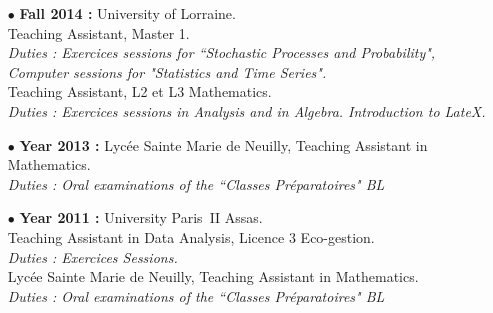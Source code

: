 \documentclass[a4paper]{article}
\begin{document}
\begin{itemize}
\item[$\bullet$] \textbf{ Fall 2014 :}  University of Lorraine.\\
					Teaching Assistant, Master 1. \\
					\textit{Duties : Exercices sessions for ``Stochastic Processes and Probability", Computer sessions for "Statistics and Time Series".}\\
					Teaching Assistant, L2 et L3 Mathematics. \\
					\textit{Duties : Exercices sessions in Analysis and in Algebra. Introduction to LateX.}\\
\item[$\bullet$] \textbf{ Year 2013 :} Lycée Sainte Marie de Neuilly, Teaching Assistant in Mathematics. \\
					\textit{Duties : Oral examinations of the ``Classes Préparatoires" BL} \\
\item[$\bullet$] \textbf{ Year 2011 :} University Paris~II Assas.\\
					Teaching Assistant in Data Analysis, Licence 3 Eco-gestion.\\
					\textit{Duties : Exercices Sessions.}\\
					Lycée Sainte Marie de Neuilly, Teaching Assistant in Mathematics. \\
					\textit{Duties : Oral examinations of the ``Classes Préparatoires" BL} 
\end{itemize}


 
\end{document}
